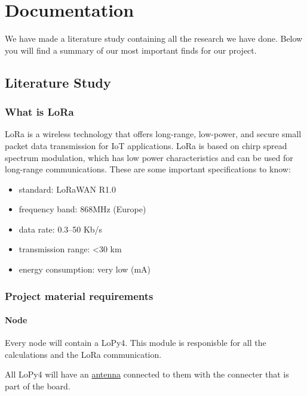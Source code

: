 \chapter{Documentation}\label{ch:documentation}

We have made a literature study containing all the research we have done. 
Below you will find a summary of our most important finds for our project.

\section{Literature Study}

    \subsection{What is LoRa}
        LoRa is a wireless technology that offers long-range, low-power, and secure small packet data transmission for IoT applications. LoRa is based on chirp spread spectrum modulation, which has low power characteristics and can be used for long-range communications. These are some important specifications to know:
        
        \begin{itemize}
            \item standard: 		    LoRaWAN R1.0
            \item frequency band: 	    868MHz (Europe)
            \item data rate: 		    0.3–50 Kb/s
            \item transmission range:	<30 km	
            \item energy consumption:	very low (mA)
        \end{itemize}
    
    \subsection{Project material requirements}
        \subsubsection{Node}
            Every node will contain a LoPy4. This module is responisble for all the calculations and the LoRa communication.
            
            All LoPy4 will have an \href{https://pycom.io/product/lora-868mhz-915mhz-sigfox-antenna-kit/}{antenna} connected to them with the connecter that is part
            of the board.
            
